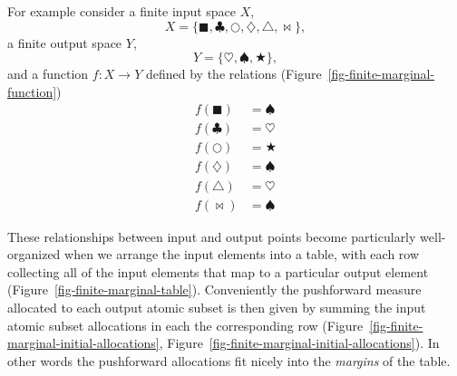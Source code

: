 \documentclass[
  letterpaper,
  DIV=11,
  numbers=noendperiod]{scrartcl}
\begin{document}
For example consider a finite input space \(X\), \[
X = \{ \blacksquare, \clubsuit, \bigcirc,
       \diamondsuit, \triangle, \bowtie \},
\] a finite output space \(Y\), \[
Y = \{ \heartsuit, \spadesuit, \bigstar \},
\] and a function \(f : X \rightarrow Y\) defined by the relations
(Figure~\ref{fig-finite-marginal-function}) \begin{align*}
f(\blacksquare) &= \spadesuit
\\
f(\clubsuit) &= \heartsuit
\\
f(\bigcirc) &= \bigstar
\\
f(\diamondsuit) &= \spadesuit
\\
f(\triangle) &= \heartsuit
\\
f(\bowtie) &= \spadesuit
\end{align*}

These relationships between input and output points become particularly
well-organized when we arrange the input elements into a table, with
each row collecting all of the input elements that map to a particular
output element (Figure~\ref{fig-finite-marginal-table}). Conveniently
the pushforward measure allocated to each output atomic subset is then
given by summing the input atomic subset allocations in each the
corresponding row (Figure~\ref{fig-finite-marginal-initial-allocations},
Figure~\ref{fig-finite-marginal-initial-allocations}). In other words
the pushforward allocations fit nicely into the \emph{margins} of the
table.
\end{document}
